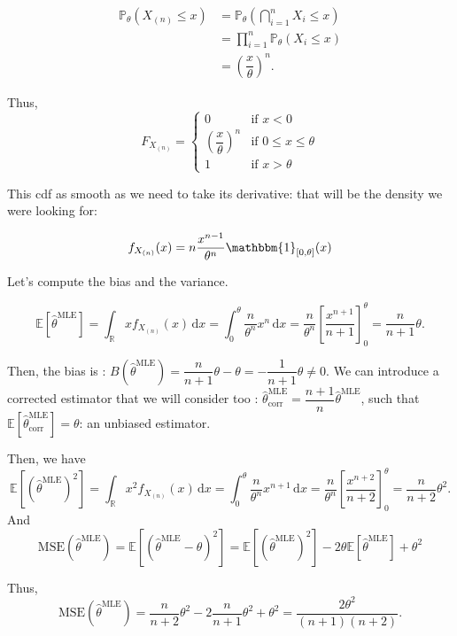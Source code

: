 \begin{align*}
    \mathbb{P}_\theta(X_{(n)} \le x) &= \mathbb{P}_\theta\left(\bigcap_{i=1}^{n} {X_i \le x}\right)\\
    &= \prod_{i=1}^{n} \mathbb{P}_\theta(X_i \le x)\\
    &= \left(\dfrac{x}{\theta}\right)^n.
\end{align*}

Thus, $$F_{X_{(n)}} = \begin{cases}
        0 & \text{if } x < 0\\
        \left(\dfrac{x}{\theta}\right)^n & \text{if } 0 \le x \le \theta\\
        1 & \text{if } x>\theta
        \end{cases}$$

This cdf as smooth as we need to take its derivative: that will be the density we were looking for:

$$f_{X_{(n)}}(x) = n \dfrac{x^{n-1}}{\theta^n} \mathbbm{1}_{[0, \theta]}(x)$$

Let's compute the bias and the variance.\newline

$$\mathbb{E}[\hat{\theta}^{\text{MLE}}] = \displaystyle \int_{\mathbb{R}} x f_{X_{(n)}}(x) \, \mathrm{d}x = \displaystyle \int_{0}^{\theta} \dfrac{n}{\theta^n} x^n \, \mathrm{d}x = \dfrac{n}{\theta^n} \left[ \dfrac{x^{n+1}}{n+1}\right]^\theta_0 = \dfrac{n}{n+1}\theta.$$

Then, the bias is : $B(\hat{\theta}^{\text{MLE}}) = \dfrac{n}{n+1}\theta - \theta = -\dfrac{1}{n+1}\theta \ne 0.$ We can introduce a corrected estimator that we will consider too : $\hat{\theta}_{\text{corr}}^{\text{MLE}} = \dfrac{n+1}{n} \hat{\theta}^{\text{MLE}}$, such that $\mathbb{E}[\hat{\theta}_{\text{corr}}^{\text{MLE}}] = \theta$:  an unbiased estimator.\newline

Then, we have $$\mathbb{E}[(\hat{\theta}^{\text{MLE}})^2] = \displaystyle \int_{\mathbb{R}} x^2 f_{X_{(n)}}(x) \, \mathrm{d}x = \displaystyle \int_{0}^{\theta} \dfrac{n}{\theta^n} x^{n+1} \, \mathrm{d}x = \dfrac{n}{\theta^n} \left[ \dfrac{x^{n+2}}{n+2}\right]^\theta_0 = \dfrac{n}{n+2}\theta^2.$$ And $$\text{MSE}(\hat{\theta}^{\text{MLE}}) = \mathbb{E}[(\hat{\theta}^{\text{MLE}} - \theta)^2] = \mathbb{E}[(\hat{\theta}^{\text{MLE}})^2] -2 \theta \mathbb{E}[\hat{\theta}^{\text{MLE}}] + \theta^2$$

Thus, $$\text{MSE}(\hat{\theta}^{\text{MLE}}) = \dfrac{n}{n+2}\theta^2 - 2\dfrac{n}{n+1}\theta^2 + \theta^2 = \dfrac{2\theta^2}{(n+1)(n+2)}.$$

